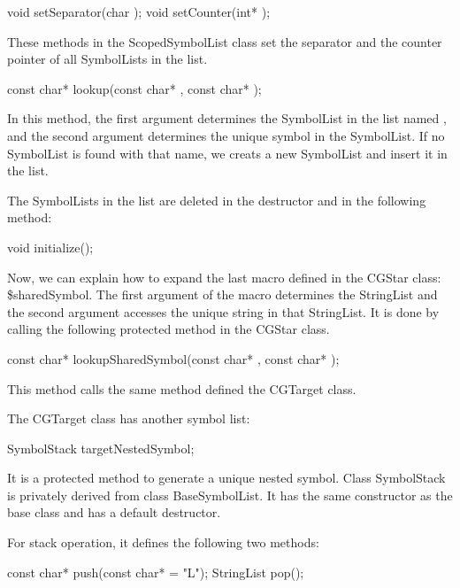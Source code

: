 \begin{example}
void setSeparator(char );
void setCounter(int* );
\end{example}

These methods in the ScopedSymbolList class set the separator and the counter
pointer of all SymbolLists in the list.

\begin{example}
const char* lookup(const char* , const char* );
\end{example}

In this method, the first argument determines the SymbolList in the list named
, and the second argument determines the unique symbol in the
SymbolList. If no SymbolList is found with that name, we creats a new
SymbolList and insert it in the list.

The SymbolLists in the list are deleted in the destructor and in the following
method:

\begin{example}
void initialize();
\end{example}

Now, we can explain how to expand the last macro defined in the CGStar class:
\$sharedSymbol. The first argument of the macro determines the StringList
and the second argument accesses the unique string in that StringList. It is
done by calling the following protected method in the CGStar class.

\begin{example}
const char* lookupSharedSymbol(const char* , const char* );
\end{example}

This method calls the same method defined the CGTarget class.

The CGTarget class has another symbol list:

\begin{example}
SymbolStack targetNestedSymbol;
\end{example}

It is a protected method to generate a unique nested symbol.
Class SymbolStack is privately derived from class BaseSymbolList. It has the
same constructor as the base class and has a default destructor.

For stack operation, it defines the following two methods:

\begin{example}
const char* push(const char*  = "L");
StringList pop();
\end{example}

